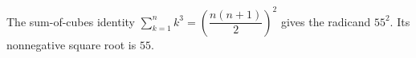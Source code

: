 The sum-of-cubes identity $\sum_{k=1}^n k^3=\left(\dfrac{n(n+1)}{2}\right)^2$ gives the radicand $55^2$. Its nonnegative square root is $\boxed{55}$.
